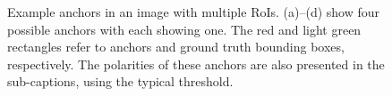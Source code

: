 \begin{figure}[!h]
    \caption[Example anchors in an image with multiple RoIs]{Example anchors in an image with multiple RoIs. (a)--(d) show four possible anchors with each showing one. The red and light green rectangles refer to anchors and ground truth bounding boxes, respectively. The polarities of these anchors are also presented in the sub-captions, using the typical threshold.}
	\label{fig:eganchor}
\end{figure}